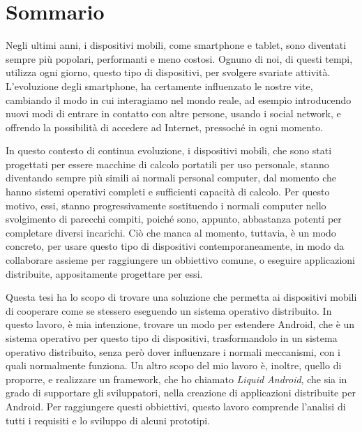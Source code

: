 %
%
\cleardoublepage
%
%

%
\chapter*{Sommario}

Negli ultimi anni, i dispositivi mobili, come smartphone e tablet, sono diventati sempre più popolari, performanti e meno costosi. Ognuno di noi, di questi tempi, utilizza ogni giorno, questo tipo di dispositivi, per svolgere svariate attività. L'evoluzione degli smartphone, ha certamente influenzato le nostre vite, cambiando il modo in cui interagiamo nel mondo reale, ad esempio introducendo nuovi modi di entrare in contatto con altre persone, usando i social network, e offrendo la possibilità di accedere ad Internet, pressoché in ogni momento.\\
\par In questo contesto di continua evoluzione, i dispositivi mobili, che sono stati progettati per essere macchine di calcolo portatili per uso personale, stanno diventando sempre più simili ai normali personal computer, dal momento che hanno sistemi operativi completi e sufficienti capacità di calcolo. Per questo motivo, essi, stanno progressivamente sostituendo i normali computer nello svolgimento di parecchi compiti, poiché sono, appunto, abbastanza potenti per completare diversi incarichi. Ciò che manca al momento, tuttavia, è un modo concreto, per usare questo tipo di dispositivi contemporaneamente, in modo da collaborare assieme per raggiungere un obbiettivo comune, o eseguire applicazioni distribuite, appositamente progettare per essi.\\
\par Questa tesi ha lo scopo di trovare una soluzione che permetta ai dispositivi mobili di cooperare come se stessero eseguendo un sistema operativo distribuito. In questo lavoro, è mia intenzione, trovare un modo per estendere Android, che è un sistema operativo per questo tipo di dispositivi, trasformandolo in un sistema operativo distribuito, senza però dover influenzare i normali meccanismi, con i quali normalmente funziona. Un altro scopo del mio lavoro è, inoltre, quello di proporre, e realizzare un framework, che ho chiamato \textit{Liquid Android}, che sia in grado di supportare gli sviluppatori, nella creazione di applicazioni distribuite per Android. Per raggiungere questi obbiettivi, questo lavoro comprende l'analisi di tutti i requisiti e lo sviluppo di alcuni prototipi.\\
